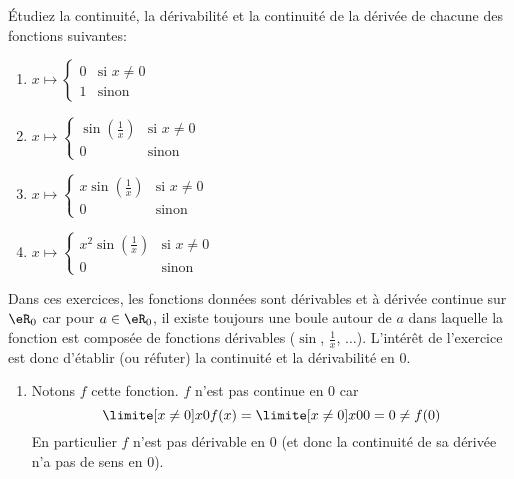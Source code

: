\begin{example}\label{EXOooMWGTooLZpgxM}\label{exo0035}

	Étudiez la continuité, la dérivabilité et la continuité de la dérivée de chacune des fonctions suivantes:
	\begin{enumerate}
		\item $x \mapsto \left\{ \begin{array}{ll} 0 & \mbox{si } x \not= 0 \\ 1 & \mbox{sinon} \end{array} \right.  $
		\item $x \mapsto \left\{ \begin{array}{ll} \sin(\frac{1}{x}) & \mbox{si } x \not= 0 \\ 0 & \mbox{sinon} \end{array} \right.  $
		\item $x \mapsto \left\{ \begin{array}{ll} x \sin(\frac{1}{x}) & \mbox{si } x \not= 0 \\ 0 & \mbox{sinon} \end{array} \right. $
		      \item\label{Item0035d} $x \mapsto \left\{ \begin{array}{ll} x^2 \sin(\frac{1}{x}) & \mbox{si } x \not= 0 \\ 0 & \mbox{sinon} \end{array} \right.  $
	\end{enumerate}

	Dans ces exercices, les fonctions données sont dérivables et à dérivée
	continue sur $\eR_0$ car pour $a \in \eR_0$, il existe toujours une
	boule autour de $a$ dans laquelle la fonction est composée de
	fonctions dérivables ($\sin$, $\frac 1x$, $\ldots$). L'intérêt de
	l'exercice est donc d'établir (ou réfuter) la continuité et la
	dérivabilité en $0$.

	\begin{enumerate}

		\item
		      Notons $f$ cette fonction. $f$ n'est pas continue en $0$ car
		      \begin{equation*}
			      \limite[x \neq 0] x 0 f(x) = \limite[x \neq 0] x 0 0 = 0 \neq f(0)
		      \end{equation*}
		      En particulier $f$ n'est pas dérivable en $0$ (et donc la continuité
		      de sa dérivée n'a pas de sens en $0$).


\end{enumerate}
\end{example}
